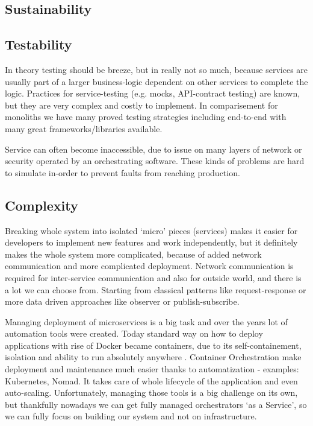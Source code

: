 \subsection{Sustainability}

\subsection{Testability}
In theory testing should be breeze, but in really not so much, because services are usually part of a larger business-logic dependent on other services to complete the logic. Practices for service-testing (e.g. mocks, API-contract testing) are known, but they are very complex and costly to implement. In comparisement for monoliths we have many proved testing strategies including end-to-end with many great frameworks/libraries available. \cite{MC_TESTABILITY}

Service can often become inaccessible, due to issue on many layers of network or security operated by an orchestrating software. These kinds of problems are hard to simulate in-order to prevent faults from reaching production.

\subsection{Complexity}
Breaking whole system into isolated `micro' pieces (services) makes it easier for developers to implement new features and work independently, but it definitely makes the whole system more complicated, because of added network communication and more complicated deployment. Network communication is required for inter-service communication and also for outside world, and there is a lot we can choose from. Starting from classical patterns like request-response or more data driven approaches like observer or publish-subscribe.

Managing deployment of microservices is a big task and over the years lot of automation tools were created. Today standard way on how to deploy applications with rise of Docker became containers, due to its self-containement, isolation and ability to run absolutely anywhere \cite{7093032}. Container Orchestration make deployment and maintenance much easier thanks to automatization - examples: Kubernetes\cite{KUBERNETES}, Nomad\cite{NOMAD}. It takes care of whole lifecycle of the application and even auto-scaling. Unfortunately, managing those tools is a big challenge on its own, but thankfully nowadays we can get fully managed orchestrators `as a Service', so we can fully focus on building our system and not on infrastructure.

